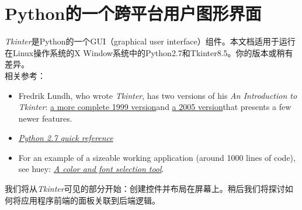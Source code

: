 \chapter[Python的一个跨平台用户图形界面]{Python的一个跨平台用户图形界面}
\textit{Tkinter}是Python的一个GUI（graphical user interface）组件。本文档适用于运行在Linux操作系统的X Window系统中的Python2.7和Tkinter8.5。你的版本或稍有差异。
\\
相关参考：
\begin{itemize}

\item Fredrik Lundh, who wrote \textit{Tkinter}, has two versions of his \textit{An Introduction to Tkinter}: \href{http://www.pythonware.com/library/tkinter/introduction/}{a more complete 1999 version}\footnotemark[3] and \href{http://effbot.org/tkinterbook/}{a 2005 version}\footnotemark[4] that presents a few newer features. 

\item \textit{\href{http://www.nmt.edu/tcc/help/pubs/python/}{Python 2.7 quick reference}}

\item For an example of a sizeable working application (around 1000 lines of code), see huey: \href{http://www.nmt.edu/tcc/help/lang/python/examples/huey/}{\textit{A color and font selection tool}}\footnotemark[6]. 

\end{itemize}

我们将从\textit{Tkinter}可见的部分开始：创建控件并布局在屏幕上。稍后我们将探讨如何将应用程序前端的面板关联到后端逻辑。

